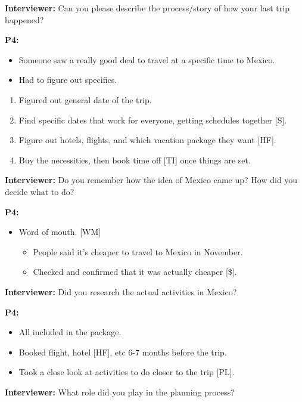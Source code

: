 \documentclass[12pt,a4paper]{article}
\begin{document}
\textbf{Interviewer: }Can you please describe the process/story of how your last trip happened? 

\textbf{P4:}

\begin{itemize}
    \item Someone saw a really good deal to travel at a specific time to Mexico. 
    \item Had to figure out specifics. 
\end{itemize}

\begin{enumerate}
    \item Figured out general date of the trip. 
    \item Find specific dates that work for everyone, getting schedules together [S]. 
    \item Figure out hotels, flights, and which vacation package they want [HF]. 
    \item Buy the necessities, then book time off [TI] once things are set. 
\end{enumerate}

\textbf{Interviewer: }Do you remember how the idea of Mexico came up? How did you decide what to do? 

\textbf{P4:}

\begin{itemize}
    \item Word of mouth. [WM]
    \begin{itemize}
        \item People said it’s cheaper to travel to Mexico in November. 
        \item Checked and confirmed that it was actually cheaper [\$]. 
    \end{itemize}
\end{itemize}

\textbf{Interviewer: }Did you research the actual activities in Mexico? 

\textbf{P4:}

\begin{itemize}
    \item All included in the package. 
    \item Booked flight, hotel [HF], etc 6-7 months before the trip. 
    \item Took a close look at activities to do closer to the trip [PL]. 
\end{itemize}

\textbf{Interviewer: }What role did you play in the planning process? 
\end{document}
